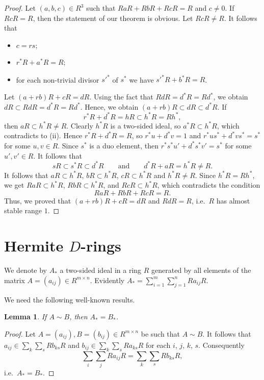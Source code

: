 \documentclass[12pt,a4paper, reqno]{amsart}
\newtheorem{lemma}{Lemma}
\begin{document}
\begin{proof}
Let  $(a,b,c)\in R^3$ such that  $RaR+RbR+RcR=R$ and  $c\ne 0$. If $RcR=R$, then the statement of our  theorem is obvious. Let $RcR\ne R$.
It follows that
\begin{itemize}
\item[(i)] $c=rs$;
\item[(ii)] $r^*R+a^*R=R$;
\item[(iii)] for each non-trivial divisor $s'^*$ of $s^*$ we have $s'^*R+b^*R=R$.
\end{itemize}

Let $(a+rb)R+cR=dR$. Using the fact that  $RdR=d^*R=Rd^*$, we obtain \linebreak
$dR\subset RdR=d^*R=Rd^*$. Hence, we obtain $(a+rb)R\subset dR\subset d^*R$. If
\[
r^*R+d^*R=hR\subset h^*R=Rh^*,
\]
then  $aR\subset h^*R\ne R$. Clearly  $h^*R$ is a two-sided ideal, so  $a^*R\subset h^*R$, which contradicts to (ii).
Hence $r^*R+d^*R=R$, so  $r^*u+d^*v=1$ and $r^*us^*+d^*vs^*=s^*$ for some $u,v\in R$. Since $s^*$ is a duo element, then $r^*s^*u'+d^*s^*v'=s^*$ for some $u',v'\in R$. It follows that
\[
sR\subset s^*R\subset d^*R\qquad \text{and}\qquad  d^*R+aR=h^*R\ne R.
\]
It follows that $aR\subset h^*R$, $bR\subset h^*R$, $cR\subset h^*R$ and $h^*R\ne R$. Since $h^*R=Rh^*$, we get  $RaR\subset h^*R$, $RbR\subset h^*R$, and  $RcR\subset h^*R$, which contradicts the condition \[
RaR+RbR+RcR=R.
\]
Thus, we proved that
$(a+rb)R+cR=dR$ and $RdR=R$, i.e.~$R$ has almost stable range $1$.
\end{proof}


\section{ Hermite $D$-rings}

We denote by $A_*$ a two-sided ideal in a ring $R$ generated by all elements of  the matrix $A=(a_{ij})\in R^{m\times n}$.
Evidently $A_*=\sum\limits_{i=1}^m\sum\limits_{j=1}^n Ra_{ij}R$.

We need the   following  well-known results.
\begin{lemma}\label{Lemma:2}
If $A\sim B$, then $A_*=B_*$.
\end{lemma}
\begin{proof}
Let $A=(a_{ij}), B=(b_{ij})\in R^{m\times n}$ be such that $A\sim B$. It follows that  $a_{ij}\in \sum_k\sum_sRb_{ks}R$ and $b_{ij}\in \sum_k\sum_sRa_{ks}R$ for each $i$, $j$, $k$, $s$. Consequently
\[
    \sum_i\sum_jRa_{ij}R= \sum_k\sum_sRb_{ks}R,
\]
i.e.~$A_*=B_*$.
\end{proof}
\end{document}

